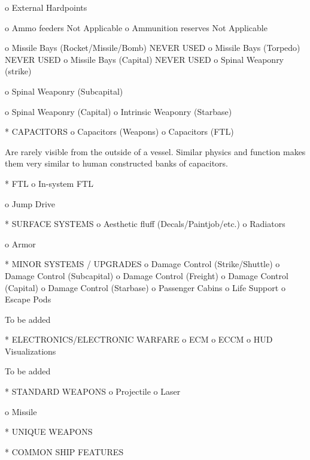           o External Hardpoints


          o Ammo feeders
            Not Applicable
          o Ammunition reserves
            Not Applicable

          o Missile Bays (Rocket/Missile/Bomb)
            NEVER USED
          o Missile Bays (Torpedo)
            NEVER USED
          o Missile Bays (Capital)
            NEVER USED
          o Spinal Weaponry (strike)

          o Spinal Weaponry (Subcapital)

          o Spinal Weaponry (Capital)
          o Intrinsic Weaponry (Starbase)



    * CAPACITORS
          o Capacitors (Weapons)
          o Capacitors (FTL)


Are rarely visible from the outside of a vessel. Similar physics and function makes them very similar to human constructed banks of capacitors.

    * FTL
          o In-system FTL


          o Jump Drive



    * SURFACE SYSTEMS
          o Aesthetic fluff (Decals/Paintjob/etc.)
          o Radiators

          o Armor


    * MINOR SYSTEMS / UPGRADES
          o Damage Control (Strike/Shuttle)
          o Damage Control (Subcapital)
          o Damage Control (Freight)
          o Damage Control (Capital)
          o Damage Control (Starbase)
          o Passenger Cabins
          o Life Support
          o Escape Pods

            To be added



    * ELECTRONICS/ELECTRONIC WARFARE
          o ECM
          o ECCM
          o HUD Visualizations

            To be added


    * STANDARD WEAPONS
          o Projectile
          o Laser

          o Missile

    * UNIQUE WEAPONS


    * COMMON SHIP FEATURES




